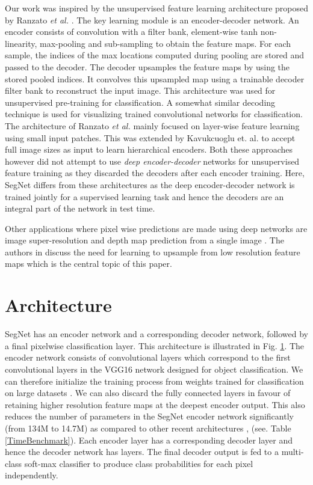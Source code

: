 \documentclass[10pt,journal,compsoc]{IEEEtran}
\begin{document}
Our work was inspired by the unsupervised feature learning architecture proposed by Ranzato \emph{et al.} \cite{Ranzato}. The key learning module is an encoder-decoder network. An encoder consists of convolution with a filter bank, element-wise tanh non-linearity, max-pooling and sub-sampling to obtain the feature maps. For each sample, the indices of the max locations computed during pooling are stored and passed to the decoder. The decoder upsamples the feature maps by using the stored pooled indices. It convolves this upsampled map using a trainable decoder filter bank to reconstruct the input image. This architecture was used for unsupervised pre-training for classification. A somewhat similar decoding technique is used for visualizing trained convolutional networks\cite{zeiler2010deconvolutional} for classification. The architecture of Ranzato \emph{et al.} mainly focused on layer-wise feature learning using small input patches. This was extended by Kavukcuoglu et. al. \cite{KorayUnsup} to accept full image sizes as input to learn hierarchical encoders. Both these approaches however did not attempt to use \textit{deep encoder-decoder} networks for unsupervised feature training as they discarded the decoders after each encoder training. Here, SegNet differs from these architectures as the deep encoder-decoder network is trained jointly for a supervised learning task and hence the decoders are an integral part of the network in test time.

Other applications where pixel wise predictions are made using deep networks are image super-resolution \cite{dong2014learning} and depth map prediction from a single image \cite{eigen2014NIPS}. The authors in \cite{eigen2014NIPS} discuss the need for learning to upsample from low resolution feature maps which is the central topic of this paper.  

\section{Architecture}
\label{Architecture}
SegNet has an encoder network and a corresponding decoder network, followed by a final pixelwise classification layer. This architecture is illustrated in Fig. \ref{Architecture}. The encoder network consists of  convolutional layers which correspond to the first  convolutional layers in the VGG16 network \cite{simonyan2014very} designed for object classification. We can therefore initialize the training process from weights trained for classification on large datasets \cite{ImageNet}. We can also discard the fully connected layers in favour of retaining higher resolution feature maps at the deepest encoder output. This also reduces the number of parameters in the SegNet encoder network  significantly (from 134M to 14.7M) as compared to other recent architectures \cite{FCN}, \cite{noh2015learning} (see. Table \ref{TimeBenchmark}). Each encoder layer has a corresponding decoder layer and hence the decoder network has  layers. The final decoder output is fed to a multi-class soft-max classifier to produce class probabilities for each pixel independently. 
\end{document}

